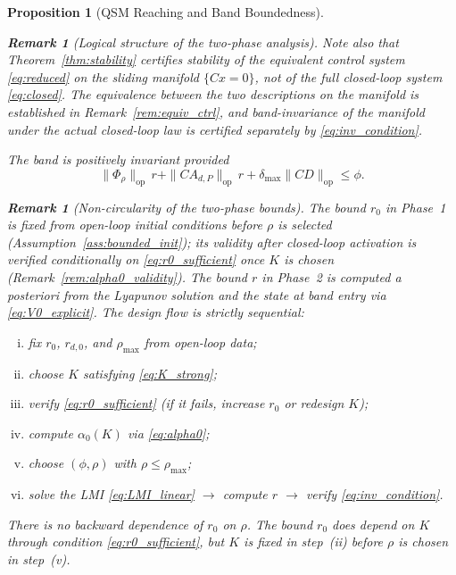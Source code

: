\documentclass[10pt]{amsart}
\numberwithin{equation}{section}
\newtheorem{proposition}[theorem]{Proposition}
\newtheorem{remark}[theorem]{Remark}
\begin{document}
\begin{proposition}[QSM Reaching and Band Boundedness]
\begin{remark}[Logical structure of the two-phase analysis]
Note also that Theorem~\ref{thm:stability} certifies stability of the \emph{equivalent
control} system \eqref{eq:reduced} on the sliding manifold $\{Cx = 0\}$, not of the
full closed-loop system \eqref{eq:closed}. The equivalence between the two descriptions
on the manifold is established in Remark~\ref{rem:equiv_ctrl}, and band-invariance
of the manifold under the actual closed-loop law is certified separately by
\eqref{eq:inv_condition}.
\end{remark}

The band is positively invariant provided
\begin{equation}\label{eq:inv_condition}
\|\Phi_\rho\|_{\mathrm{op}}\,r + \|CA_{d,P}\|_{\mathrm{op}}\,r
+ \delta_{\max}\|CD\|_{\mathrm{op}} \leq \phi.
\end{equation}

\begin{remark}[Non-circularity of the two-phase bounds]\label{rem:consistency}
The bound $r_0$ in Phase~1 is fixed from open-loop initial conditions before $\rho$ is
selected (Assumption~\ref{ass:bounded_init}); its validity after closed-loop activation
is verified conditionally on \eqref{eq:r0_sufficient} once $K$ is chosen
(Remark~\ref{rem:alpha0_validity}). The bound $r$ in Phase~2 is computed \emph{a
posteriori} from the Lyapunov solution and the state at band entry via
\eqref{eq:V0_explicit}. The design flow is strictly sequential:
\begin{enumerate}[(i)]
  \item fix $r_0$, $r_{d,0}$, and $\rho_{\max}$ from open-loop data;
  \item choose $K$ satisfying \eqref{eq:K_strong};
  \item verify \eqref{eq:r0_sufficient} (if it fails, increase $r_0$ or redesign $K$);
  \item compute $\alpha_0(K)$ via \eqref{eq:alpha0};
  \item choose $(\phi, \rho)$ with $\rho \leq \rho_{\max}$;
  \item solve the LMI \eqref{eq:LMI_linear} $\to$ compute $r$ $\to$ verify
        \eqref{eq:inv_condition}.
\end{enumerate}
There is no backward dependence of $r_0$ on $\rho$. The bound $r_0$ does depend on
$K$ through condition \eqref{eq:r0_sufficient}, but $K$ is fixed in step~(ii) before
$\rho$ is chosen in step~(v).


\end{remark}
\end{proposition}
\end{document}
